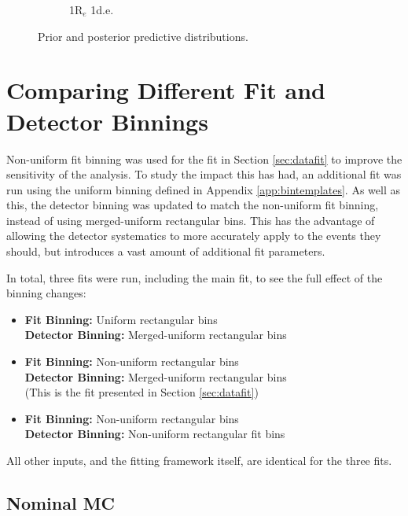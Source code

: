 \begin{figure}[!htbp]
\begin{subfigure}{.49\textwidth}
   \caption{1R$_{e}$ 1d.e.}
\end{subfigure}
\caption{Prior and posterior predictive \SK distributions.}
\label{fig:skpp}
\end{figure}

\section{Comparing Different Fit and Detector Binnings}\label{sec:newbin}

Non-uniform fit binning was used for the fit in Section \ref{sec:datafit} to improve the sensitivity of the analysis. To study the impact this has had, an additional fit was run using the uniform binning defined in Appendix \ref{app:bintemplates}. As well as this, the detector binning was updated to match the non-uniform fit binning, instead of using merged-uniform rectangular bins. This has the advantage of allowing the detector systematics to more accurately apply to the events they should, but introduces a vast amount of additional fit parameters.

In total, three fits were run, including the main fit, to see the full effect of the binning changes:

\begin{itemize}

\item \textbf{Fit Binning: } Uniform rectangular bins\\
\textbf{Detector Binning: } Merged-uniform rectangular bins

\item \textbf{Fit Binning: } Non-uniform rectangular bins\\
\textbf{Detector Binning: } Merged-uniform rectangular bins\\
(This is the fit presented in Section \ref{sec:datafit})

\item \textbf{Fit Binning: } Non-uniform rectangular bins\\
\textbf{Detector Binning: } Non-uniform rectangular fit bins

\end{itemize}

All other inputs, and the fitting framework itself, are identical for the three fits.

\subsection{Nominal MC}

